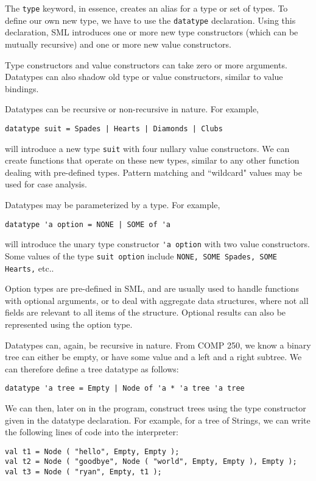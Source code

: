 \documentclass[11pt]{article}
\begin{document}
The \verb~type~ keyword, in essence, creates an alias for a type or set of types. To define our own new type, we have to use the \verb~datatype~ declaration. Using this declaration, SML introduces one or more new type constructors (which can be mutually recursive) and one or more new value constructors. 

Type constructors and value constructors can take zero or more arguments. Datatypes can also shadow old type or value constructors, similar to value bindings.

Datatypes can be recursive or non-recursive in nature. For example,

\verb~datatype suit = Spades | Hearts | Diamonds | Clubs~

will introduce a new type \verb~suit~ with four nullary value constructors. We can create functions that operate on these new types, similar to any other function dealing with pre-defined types. Pattern matching and ``wildcard" values may be used for case analysis.

Datatypes may be parameterized by a type. For example, 

\verb~datatype 'a option = NONE | SOME of 'a~

will introduce the unary type constructor \verb~'a option~ with two value constructors. Some values of the type \verb~suit option~ include \verb~NONE, SOME Spades, SOME Hearts,~ etc..

Option types are pre-defined in SML, and are usually used to handle functions with optional arguments, or to deal with aggregate data structures, where not all fields are relevant to all items of the structure. Optional results can also be represented using the option type.

Datatypes can, again, be recursive in nature. From COMP 250, we know a binary tree can either be empty, or have some value and a left and a right subtree. We can therefore define a tree datatype as follows:

\verb~datatype 'a tree = Empty | Node of 'a * 'a tree 'a tree~

We can then, later on in the program, construct trees using the type constructor given in the datatype declaration. For example, for a tree of Strings, we can write the following lines of code into the interpreter:

\begin{verbatim}
val t1 = Node ( "hello", Empty, Empty );
val t2 = Node ( "goodbye", Node ( "world", Empty, Empty ), Empty );
val t3 = Node ( "ryan", Empty, t1 );
\end{verbatim}
\end{document}
